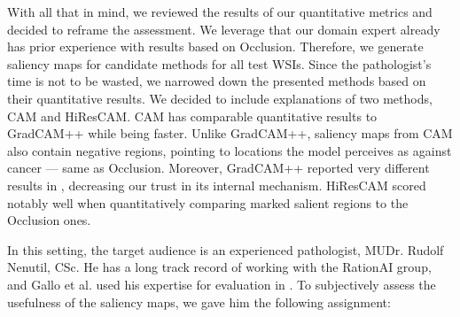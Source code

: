 With all that in mind, we reviewed the results of our quantitative metrics and decided to reframe the assessment.
We leverage that our domain expert already has prior experience with results based on Occlusion.
Therefore, we generate saliency maps for candidate methods for all test WSIs.
Since the pathologist's time is not to be wasted, we narrowed down the presented methods based on their quantitative results.
We decided to include explanations of two methods, CAM and HiResCAM.
CAM has comparable quantitative results to GradCAM++ while being faster.
Unlike GradCAM++, saliency maps from CAM also contain negative regions, pointing to locations the model perceives as against cancer --- same as Occlusion.
Moreover, GradCAM++ reported very different results in , decreasing our trust in its internal mechanism.
HiResCAM scored notably well when quantitatively comparing marked salient regions to the Occlusion ones.

In this setting, the target audience is an experienced pathologist, MUDr. Rudolf Nenutil, CSc.
He has a long track record of working with the RationAI group, and Gallo et al. used his expertise for evaluation in \cite{gallo}.
To subjectively assess the usefulness of the saliency maps, we gave him the following assignment:

